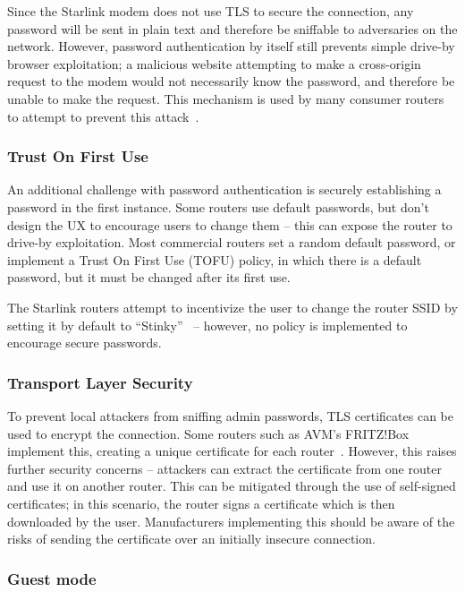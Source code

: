 Since the Starlink modem does not use TLS to secure the connection, any password will be sent in plain text and therefore be sniffable to adversaries on the network.
However, password authentication by itself still prevents simple drive-by browser exploitation; a malicious website attempting to make a cross-origin request to the modem would not necessarily know the password, and therefore be unable to make the request.
This mechanism is used by many consumer routers to attempt to prevent this attack~\cite{drive_by_pharming}.

\subsubsection{Trust On First Use}

An additional challenge with password authentication is securely establishing a password in the first instance.
Some routers use default passwords, but don't design the UX to encourage users to change them -- this can expose the router to drive-by exploitation.
Most commercial routers set a random default password, or implement a Trust On First Use (TOFU) policy, in which there is a default password, but it must be changed after its first use.

The Starlink routers attempt to incentivize the user to change the router SSID by setting it by default to ``Stinky''~\cite{stinky_starlink} -- however, no policy is implemented to encourage secure passwords.

\subsubsection{Transport Layer Security}

To prevent local attackers from sniffing admin passwords, TLS certificates can be used to encrypt the connection.
Some routers such as AVM's FRITZ!Box implement this, creating a unique certificate for each router~\cite{fritzbox_cert}.
However, this raises further security concerns -- attackers can extract the certificate from one router and use it on another router.
This can be mitigated through the use of self-signed certificates; in this scenario, the router signs a certificate which is then downloaded by the user.
Manufacturers implementing this should be aware of the risks of sending the certificate over an initially insecure connection.

\subsubsection{Guest mode}

